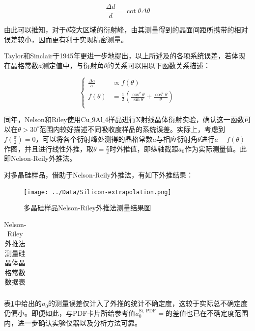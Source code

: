 \documentclass{thuemp}
\begin{document}
\begin{equation}
    \frac{\Delta d}{d} = \cot{\theta}\Delta\theta 
    \label{eqn:d_err}
\end{equation}

由此可以推知，对于$\theta$较大区域的衍射峰，由其测量得到的晶面间距所携带的相对误差较小，因而更有利于实现精密测量。

Taylor和Sinclair于1945年更进一步地提出，以上所述及的各项系统误差，若体现在晶格常数$a$测定值中，与衍射角$\theta$的关系可以用以下函数关系描述：

\begin{equation}
    \begin{cases}
        \frac{\Delta a}{a} & \propto f(\theta) \\
        f(\theta) & = \frac{1}{2} \left(\frac{\cos^2\theta}{\sin\theta} + \frac{\cos^2\theta}{\theta}\right) \\
    \end{cases}
\end{equation}

同年，Nelson和Riley使用$\text{Cu_9Al_4}$样品进行X射线晶体衍射实验，确认这一函数可以在$\theta > 30^\circ$范围内较好描述不同吸收度样品的系统误差。实际上，考虑到$f\left(\frac{\pi}{2}\right) = 0$，可以将各个衍射峰处测得的晶格常数$a$与相应衍射角$\theta$进行$a-f(\theta)$作图，并且进行线性外推，取$\theta=\frac{\pi}{2}$时外推值，即纵轴截距$a_0$作为实际测量值。此即Nelson-Reily外推法。

对多晶硅样品，借助于Nelson-Reily外推法，有如下外推结果：

\begin{figure}[H]
    \centering
    \texttt{[image: ../Data/Silicon-extrapolation.png]}
    \caption{多晶硅样品Nelson-Riley外推法测量结果图}
    \label{fig:si_xrd_extrapol}
\end{figure}

\begin{table}[H]
    \centering
    \captionnamefont{\wuhao\bf\heiti}
    \captiontitlefont{\wuhao\bf\heiti}
    \caption{Nelson-Riley外推法测量硅晶体晶格常数数据表}
    \label{tab:si_xrd_extrapol}
    \liuhao
    \begin{tabular}{ccccc}
        \toprule
        \midrule
        \bottomrule
    \end{tabular}
\end{table}

表\ref{tab:si_xrd_extrapol}中给出的$a_0$的测量误差仅计入了外推的统计不确定度，这较于实际总不确定度仍偏小。即便如此，与PDF卡片所给参考值$a_0^{\text{Si, PDF}} = $的差值也已在不确定度范围内，进一步确认实验仪器以及分析方法可靠。
\end{document}
